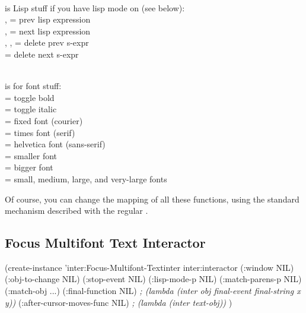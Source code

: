 \begin{tabular}
\begin{group}\\
    is Lisp stuff if you have lisp mode on (see below):\\
       ,  = prev lisp expression\\
       ,  =  next lisp expression\\
       , ,  = delete prev s-expr\\
         = delete next s-expr\\
\end{group}\\

    is for font stuff:\\
        = toggle bold\\
        = toggle italic\\
        = fixed font (courier)\\
        = times font (serif)\\
        = helvetica font (sans-serif)\\
        = smaller font\\
        = bigger font\\
         = small, medium, large, and very-large fonts\\
\end{tabular}

Of course, you can change the mapping of all these functions, using
the standard  mechanism described with the regular
.

\subsection{Focus Multifont Text Interactor}

\begin{programexample}

(create-instance 'inter:Focus-Multifont-Textinter inter:interactor
   (:window NIL)
   (:obj-to-change NIL)
   (:stop-event NIL)
   (:lisp-mode-p NIL)
   (:match-parens-p NIL)
   (:match-obj ...)
   (:final-function NIL)           {\it ; (lambda (inter obj final-event final-string x y))}
   (:after-cursor-moves-func NIL)  {\it ; (lambda (inter text-obj))}
   )
\end{programexample}

